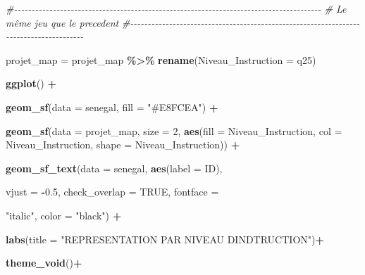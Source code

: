 \documentclass[
]{article}
\newenvironment{Shaded}{\begin{snugshade}}{\end{snugshade}}
\newcommand{\AttributeTok}[1]{\textcolor[rgb]{0.13,0.29,0.53}{#1}}
\newcommand{\CommentTok}[1]{\textcolor[rgb]{0.56,0.35,0.01}{\textit{#1}}}
\newcommand{\ConstantTok}[1]{\textcolor[rgb]{0.56,0.35,0.01}{#1}}
\newcommand{\DecValTok}[1]{\textcolor[rgb]{0.00,0.00,0.81}{#1}}
\newcommand{\FloatTok}[1]{\textcolor[rgb]{0.00,0.00,0.81}{#1}}
\newcommand{\FunctionTok}[1]{\textcolor[rgb]{0.13,0.29,0.53}{\textbf{#1}}}
\newcommand{\NormalTok}[1]{#1}
\newcommand{\OtherTok}[1]{\textcolor[rgb]{0.56,0.35,0.01}{#1}}
\newcommand{\SpecialCharTok}[1]{\textcolor[rgb]{0.81,0.36,0.00}{\textbf{#1}}}
\newcommand{\StringTok}[1]{\textcolor[rgb]{0.31,0.60,0.02}{#1}}
\begin{document}
\begin{Shaded}
\begin{Highlighting}[]
\CommentTok{\#{-}{-}{-}{-}{-}{-}{-}{-}{-}{-}{-}{-}{-}{-}{-}{-}{-}{-}{-}{-}{-}{-}{-}{-}{-}{-}{-}{-}{-}{-}{-}{-}{-}{-}{-}{-}{-}{-}{-}{-}{-}{-}{-}{-}{-}{-}{-}{-}{-}{-}{-}{-}{-}{-}{-}{-}{-}{-}{-}{-}{-}{-}{-}{-}{-}{-}{-}{-}{-}{-}{-}{-}{-}{-}{-}{-}{-}{-}{-}{-}{-}{-}{-}{-}{-}{-}{-}}
\CommentTok{\#   Le même jeu que le precedent}
\CommentTok{\#{-}{-}{-}{-}{-}{-}{-}{-}{-}{-}{-}{-}{-}{-}{-}{-}{-}{-}{-}{-}{-}{-}{-}{-}{-}{-}{-}{-}{-}{-}{-}{-}{-}{-}{-}{-}{-}{-}{-}{-}{-}{-}{-}{-}{-}{-}{-}{-}{-}{-}{-}{-}{-}{-}{-}{-}{-}{-}{-}{-}{-}{-}{-}{-}{-}{-}{-}{-}{-}{-}{-}{-}{-}{-}{-}{-}{-}{-}{-}{-}{-}{-}{-}{-}{-}{-}{-}}

\NormalTok{projet\_map }\OtherTok{=}\NormalTok{ projet\_map }\SpecialCharTok{\%\textgreater{}\%} \FunctionTok{rename}\NormalTok{(}\AttributeTok{Niveau\_Instruction =}\NormalTok{ q25)}

\FunctionTok{ggplot}\NormalTok{() }\SpecialCharTok{+}
  
  \FunctionTok{geom\_sf}\NormalTok{(}\AttributeTok{data =}\NormalTok{ senegal, }\AttributeTok{fill =} \StringTok{"\#E8FCEA"}\NormalTok{) }\SpecialCharTok{+}
  
  \FunctionTok{geom\_sf}\NormalTok{(}\AttributeTok{data =}\NormalTok{ projet\_map, }\AttributeTok{size =} \DecValTok{2}\NormalTok{, }\FunctionTok{aes}\NormalTok{(}\AttributeTok{fill =}
\NormalTok{                                             Niveau\_Instruction, }\AttributeTok{col =}\NormalTok{ Niveau\_Instruction, }\AttributeTok{shape =}
\NormalTok{                                             Niveau\_Instruction)) }\SpecialCharTok{+}
  
  \FunctionTok{geom\_sf\_text}\NormalTok{(}\AttributeTok{data =}\NormalTok{ senegal, }\FunctionTok{aes}\NormalTok{(}\AttributeTok{label =}\NormalTok{ ID),}
               
               \AttributeTok{vjust =} \SpecialCharTok{{-}}\FloatTok{0.5}\NormalTok{, }\AttributeTok{check\_overlap =} \ConstantTok{TRUE}\NormalTok{, }\AttributeTok{fontface =}
                 
                 \StringTok{"italic"}\NormalTok{, }\AttributeTok{color =} \StringTok{"black"}\NormalTok{) }\SpecialCharTok{+}
  
  \FunctionTok{labs}\NormalTok{(}\AttributeTok{title =} \StringTok{"REPRESENTATION PAR NIVEAU D\textquotesingle{}INDTRUCTION"}\NormalTok{)}\SpecialCharTok{+}
  
  \FunctionTok{theme\_void}\NormalTok{()}\SpecialCharTok{+}
  

\end{Highlighting}
\end{Shaded}
\end{document}
